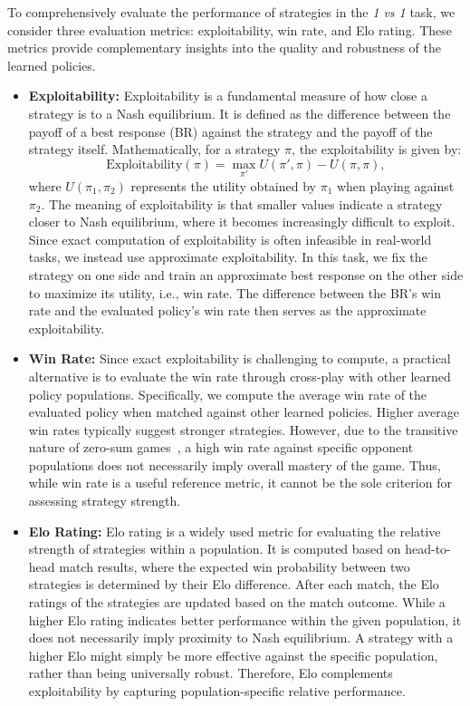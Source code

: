 To comprehensively evaluate the performance of strategies in the \textit{1 vs 1} task, we consider three evaluation metrics: exploitability, win rate, and Elo rating. These metrics provide complementary insights into the quality and robustness of the learned policies.

\begin{itemize}
    \item \textbf{Exploitability:} 
    Exploitability is a fundamental measure of how close a strategy is to a Nash equilibrium. It is defined as the difference between the payoff of a best response (BR) against the strategy and the payoff of the strategy itself. Mathematically, for a strategy \(\pi\), the exploitability is given by:
    \[
    \text{Exploitability}(\pi) = \max_{\pi'} U(\pi', \pi) - U(\pi, \pi),
    \]
    where \(U(\pi_1, \pi_2)\) represents the utility obtained by \(\pi_1\) when playing against \(\pi_2\). The meaning of exploitability is that smaller values indicate a strategy closer to Nash equilibrium, where it becomes increasingly difficult to exploit. Since exact computation of exploitability is often infeasible in real-world tasks, we instead use approximate exploitability. In this task, we fix the strategy on one side and train an approximate best response on the other side to maximize its utility, i.e., win rate. The difference between the BR's win rate and the evaluated policy's win rate then serves as the approximate exploitability.

    \item \textbf{Win Rate:} 
    Since exact exploitability is challenging to compute, a practical alternative is to evaluate the win rate through cross-play with other learned policy populations. 
    Specifically, we compute the average win rate of the evaluated policy when matched against other learned policies. Higher average win rates typically suggest stronger strategies. However, due to the transitive nature of zero-sum games~\cite{czarnecki2020real}, a high win rate against specific opponent populations does not necessarily imply overall mastery of the game. Thus, while win rate is a useful reference metric, it cannot be the sole criterion for assessing strategy strength.

    \item \textbf{Elo Rating:} 
    Elo rating is a widely used metric for evaluating the relative strength of strategies within a population. It is computed based on head-to-head match results, where the expected win probability between two strategies is determined by their Elo difference. After each match, the Elo ratings of the strategies are updated based on the match outcome. While a higher Elo rating indicates better performance within the given population, it does not necessarily imply proximity to Nash equilibrium. A strategy with a higher Elo might simply be more effective against the specific population, rather than being universally robust. Therefore, Elo complements exploitability by capturing population-specific relative performance.
\end{itemize}

